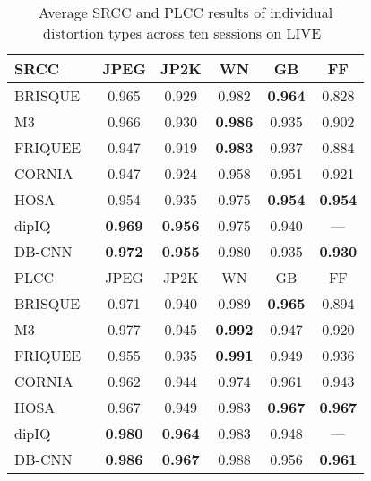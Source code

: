 \documentclass[journal]{IEEEtran}
\begin{document}
\begin{table}[t]
  \centering
  \caption{Average SRCC and PLCC results of individual distortion types across ten sessions on LIVE~\cite{sheikh2006statistical}}\label{tab:live_idd}
  \begin{tabular}{l|ccccc}
      \toprule
SRCC & JPEG & JP2K & WN & GB & FF \\
     \hline

      BRISQUE~\cite{mittal2012no} & 0.965 & 0.929 & 0.982 & {\bf 0.964} & 0.828 \\
      M3~\cite{xue2014blind}& 0.966 & 0.930 & {\bf 0.986} & 0.935 & 0.902 \\
FRIQUEE~\cite{ghadiyaram2017perceptual} & 0.947 & 0.919 & {\bf 0.983} & 0.937 & 0.884 \\
      CORNIA~\cite{ye2012unsupervised} & 0.947 & 0.924 & 0.958 & 0.951 & 0.921 \\
      HOSA~\cite{xu2016blind} & 0.954 & 0.935 & 0.975 & {\bf 0.954} & {\bf 0.954} \\
            dipIQ~\cite{ma2017dipiq} & {\bf 0.969} & {\bf 0.956} & 0.975 & 0.940 & --- \\
     \hline
        DB-CNN& {\bf 0.972} & {\bf 0.955} & 0.980 & 0.935 & {\bf 0.930} \\
\midrule
PLCC & JPEG & JP2K & WN & GB &  FF \\
     \hline

      BRISQUE~\cite{mittal2012no} & 0.971 & 0.940 & 0.989 & {\bf 0.965} & 0.894 \\
      M3~\cite{xue2014blind}& 0.977 & 0.945 & {\bf 0.992} & 0.947 & 0.920 \\
FRIQUEE~\cite{ghadiyaram2017perceptual} & 0.955 & 0.935 & {\bf 0.991} & 0.949 & 0.936 \\
      CORNIA~\cite{ye2012unsupervised} & 0.962 & 0.944 & 0.974 & 0.961 & 0.943 \\
      HOSA~\cite{xu2016blind} & 0.967 & 0.949 & 0.983 & {\bf 0.967} & {\bf 0.967} \\
            dipIQ~\cite{ma2017dipiq} & {\bf 0.980} & {\bf 0.964} & 0.983 & 0.948 & --- \\
     \hline
        DB-CNN& {\bf 0.986} & {\bf 0.967} & 0.988 & 0.956 & {\bf 0.961} \\
     \bottomrule
   \end{tabular}
\end{table}
\end{document}

